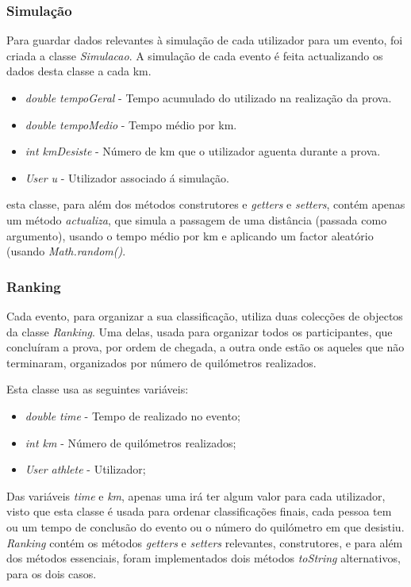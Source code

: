 \documentclass[12pt,notitlepage]{article}
\begin{document}
\subsubsection{Simulação}

Para guardar dados relevantes à simulação de cada utilizador para um evento, foi criada a classe \textit{Simulacao}. A simulação de cada evento é feita actualizando os dados desta classe a cada km.

\begin{itemize}
\item \textit{double tempoGeral} - Tempo acumulado do utilizado na realização da prova.
\item \textit{double tempoMedio} - Tempo médio por km.
\item \textit{int kmDesiste} - Número de km que o utilizador aguenta durante a prova.
\item \textit{User u} - Utilizador associado á simulação.
\end{itemize}
esta classe, para além dos métodos construtores e \textit{getters} e \textit{setters}, contém apenas um método \textit{actualiza}, que simula a passagem de uma distância (passada como argumento), usando o tempo médio por km e aplicando um factor aleatório (usando \textit{Math.random()}.



\subsubsection{Ranking}

Cada evento, para organizar a sua classificação, utiliza duas colecções de objectos da classe \textit{Ranking}. Uma delas, usada para organizar todos os participantes, que concluíram a prova, por ordem de chegada, a outra onde estão os aqueles que não terminaram, organizados por número de quilómetros realizados.

Esta classe usa as seguintes variáveis:
\begin{itemize}
\item \textit{double time} - Tempo de realizado no evento;
\item \textit{int km} - Número de quilómetros realizados;
\item \textit{User athlete} - Utilizador;
\end{itemize}
Das variáveis \textit{time} e \textit{km}, apenas uma irá ter algum valor para cada utilizador, visto que esta classe é usada para ordenar classificações finais, cada pessoa tem ou um tempo de conclusão do evento ou o número do quilómetro em que desistiu. \textit{Ranking} contém os métodos \textit{getters} e \textit{setters} relevantes, construtores, e para além dos métodos essenciais, foram implementados dois métodos \textit{toString} alternativos, para os dois casos.
\end{document}
